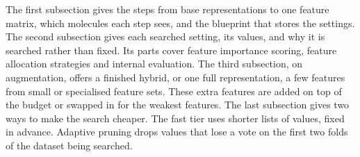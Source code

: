 The first subsection gives the steps from base representations to one feature matrix, which molecules each step sees, and the blueprint that stores the settings. The second subsection gives each searched setting, its values, and why it is searched rather than fixed. Its parts cover feature importance scoring, feature allocation strategies and internal evaluation. The third subsection, on augmentation, offers a finished hybrid, or one full representation, a few features from small or specialised feature sets. These extra features are added on top of the budget or swapped in for the weakest features. The last subsection gives two ways to make the search cheaper. The fast tier uses shorter lists of values, fixed in advance. Adaptive pruning drops values that lose a vote on the first two folds of the dataset being searched.


